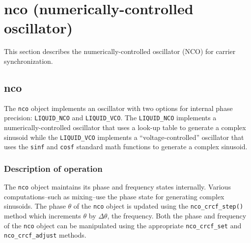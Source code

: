 % 
%

\newpage
\section{nco (numerically-controlled oscillator)}
\label{module:nco}
This section describes the numerically-controlled oscillator (NCO) for carrier
synchronization.

\subsection{{nco}}
\label{module:nco:nco}
The {\tt nco} object implements an oscillator with two options for internal
phase precision: {\tt LIQUID\_NCO} and {\tt LIQUID\_VCO}.
The {\tt LIQUID\_NCO} implements a numerically-controlled oscillator that uses
a look-up table to generate a complex sinusoid while
the {\tt LIQUID\_VCO} implements a ``voltage-controlled'' oscillator that uses
the {\tt sinf} and {\tt cosf} standard math functions to generate a complex
sinusoid.

\subsubsection{Description of operation}
The {\tt nco} object maintains its phase and frequency states internally.
Various computations--such as mixing--use the phase state for generating
complex sinusoids.
The phase $\theta$ of the {\tt nco} object is updated using the
{\tt nco\_crcf\_step()} method which increments $\theta$ by $\Delta\theta$, the
frequency.
Both the phase and frequency of the {\tt nco} object can be manipulated using
the appropriate {\tt nco\_crcf\_set} and {\tt nco\_crcf\_adjust} methods.

